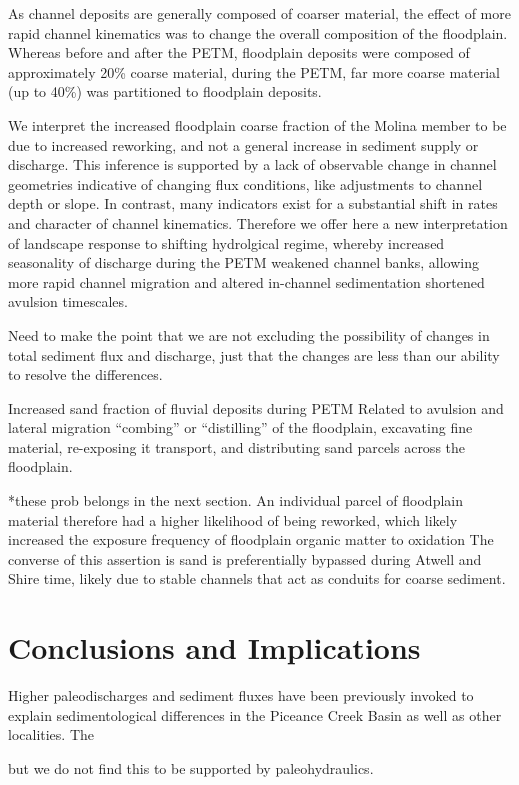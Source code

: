 \documentclass[draft]{compact_proposal}
\begin{document}
As channel deposits are generally composed of coarser material, the effect of more rapid channel kinematics was to change the overall composition of the floodplain.
Whereas before and after the PETM, floodplain deposits were composed of approximately 20\% coarse material, during the PETM, far more coarse material (up to 40\%) was partitioned to floodplain deposits.

We interpret the increased floodplain coarse fraction of the Molina member to be due to increased reworking, and not a general increase in sediment supply or discharge.
This inference is supported by a lack of observable change in channel geometries indicative of changing flux conditions, like adjustments to channel depth or slope.
In contrast, many indicators exist for a substantial shift in rates and character of channel kinematics.
Therefore we offer here a new interpretation of landscape response to shifting hydrolgical regime, whereby increased seasonality of discharge during the PETM weakened channel banks, allowing more rapid channel migration and altered in-channel sedimentation shortened avulsion timescales.

Need to make the point that we are not excluding the possibility of changes in total sediment flux and discharge, just that the changes are less than our ability to resolve the differences.

Increased sand fraction of fluvial deposits during PETM
  Related to avulsion and lateral migration “combing” or “distilling” of the floodplain, excavating fine material, re-exposing it transport, and distributing sand parcels across the floodplain.

*these prob belongs in the next section.
  An individual parcel of floodplain material therefore had a higher likelihood of being reworked, which likely increased the exposure frequency of floodplain organic matter to oxidation
  The converse of this assertion is sand is preferentially bypassed during Atwell and Shire time, likely due to stable channels that act as conduits for coarse sediment.

\section{Conclusions and Implications}

Higher paleodischarges and sediment fluxes have been previously invoked to explain sedimentological differences in the Piceance Creek Basin as well as other localities.
The

but we do not find this to be supported by paleohydraulics.
\end{document}
